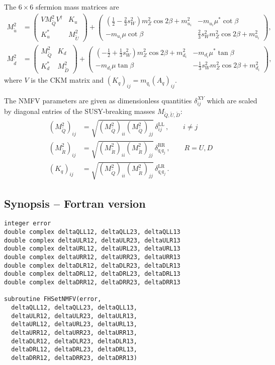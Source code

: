 \documentclass[12pt,a4paper]{report}
\newcommand{\FSYNOPSIS}{\subsection*{Synopsis -- Fortran version}}
\newcommand\rL{\mathrm{L}}
\newcommand\rR{\mathrm{R}}
\begin{document}
The $6\times 6$ sfermion mass matrices are
\begin{align*}
M_{\tilde u}^2 &= \begin{pmatrix}
V M^2_{\tilde Q} V^\dagger & K_u \\
K_u^* & M^2_{\tilde U}
\end{pmatrix} +
\begin{pmatrix}
(\frac 12 - \frac 23 s_W^2) m_Z^2\cos 2\beta + m_{u_i}^2 &
  -m_{u_i}\mu^* \cot\beta \\
-m_{u_i}\mu \cot\beta &
  \frac 23 s_W^2 m_Z^2\cos 2\beta + m_{u_i}^2
\end{pmatrix}, \\
M_{\tilde d}^2 &= \begin{pmatrix}
M^2_{\tilde Q} & K_d \\
K_d^* & M^2_{\tilde D}
\end{pmatrix} +
\begin{pmatrix}
(-\frac 12 + \frac 13 s_W^2) m_Z^2\cos 2\beta + m_{d_i}^2 &
  -m_{d_i}\mu^* \tan\beta \\
-m_{d_i}\mu \tan\beta &
  -\frac 13 s_W^2 m_Z^2\cos 2\beta + m_{d_i}^2
\end{pmatrix},
\end{align*}
where $V$ is the CKM matrix and $(K_q)_{ij} = m_{q_i} (A_q)_{ij}$.

The NMFV parameters are given as dimensionless quantities 
$\delta^{XY}_{ij}$ which are scaled by diagonal entries of 
the SUSY-breaking masses $M_{\tilde Q,\tilde U,\tilde D}$:
\begin{align*}
(M_{\tilde Q}^2)_{ij} &=
  \sqrt{(M_{\tilde Q}^2)_{ii} (M_{\tilde Q}^2)_{jj}}\,
  \delta_{ij}^{\rL\rL}\,, \qquad i\neq j \\
(M_{\tilde R}^2)_{ij} &=
  \sqrt{(M_{\tilde R}^2)_{ii} (M_{\tilde R}^2)_{jj}}\,
  \delta_{q_i q_j}^{\rR\rR}\,, \qquad R = U, D \\
(K_q)_{ij} &=
  \sqrt{(M_{\tilde Q}^2)_{ii} (M_{\tilde R}^2)_{jj}}\,
  \delta_{q_i q_j}^{\rL\rR}\,.
\end{align*}

\FSYNOPSIS

\begin{verbatim}
integer error
double complex deltaQLL12, deltaQLL23, deltaQLL13
double complex deltaULR12, deltaULR23, deltaULR13
double complex deltaURL12, deltaURL23, deltaURL13
double complex deltaURR12, deltaURR23, deltaURR13
double complex deltaDLR12, deltaDLR23, deltaDLR13
double complex deltaDRL12, deltaDRL23, deltaDRL13
double complex deltaDRR12, deltaDRR23, deltaDRR13

subroutine FHSetNMFV(error,
  deltaQLL12, deltaQLL23, deltaQLL13,
  deltaULR12, deltaULR23, deltaULR13,
  deltaURL12, deltaURL23, deltaURL13,
  deltaURR12, deltaURR23, deltaURR13,
  deltaDLR12, deltaDLR23, deltaDLR13,
  deltaDRL12, deltaDRL23, deltaDRL13,
  deltaDRR12, deltaDRR23, deltaDRR13)
\end{verbatim}
\end{document}
